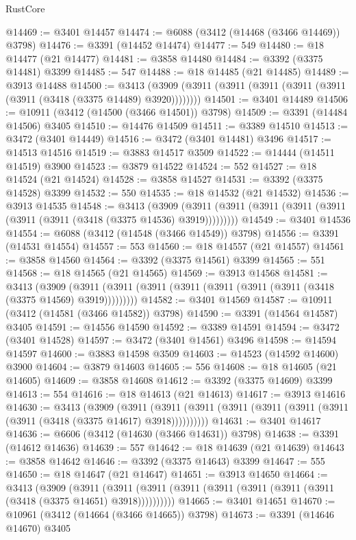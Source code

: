 \begin{lexlean}{RustCore}
\begin{coremodule}
@14469 := @3401 @14457
@14474 := @6088 (@3412 (@14468 (@3466 @14469)) @3798)
@14476 := @3391 (@14452 @14474)
@14477 := 549
@14480 := @18 @14477 (@21 @14477)
@14481 := @3858 @14480
@14484 := @3392 (@3375 @14481) @3399
@14485 := 547
@14488 := @18 @14485 (@21 @14485)
@14489 := @3913 @14488
@14500 := @3413 (@3909 (@3911 (@3911 (@3911 (@3911 (@3911 (@3911 (@3418 (@3375 @14489) @3920))))))))
@14501 := @3401 @14489
@14506 := @10911 (@3412 (@14500 (@3466 @14501)) @3798)
@14509 := @3391 (@14484 @14506) @3405
@14510 := @14476 @14509
@14511 := @3389 @14510
@14513 := @3472 (@3401 @14449)
@14516 := @3472 (@3401 @14481) @3496
@14517 := @14513 @14516
@14519 := @3883 @14517 @3509
@14522 := @14444 (@14511 @14519) @3900
@14523 := @3879 @14522
@14524 := 552
@14527 := @18 @14524 (@21 @14524)
@14528 := @3858 @14527
@14531 := @3392 (@3375 @14528) @3399
@14532 := 550
@14535 := @18 @14532 (@21 @14532)
@14536 := @3913 @14535
@14548 := @3413
    (@3909 (@3911 (@3911 (@3911 (@3911 (@3911 (@3911 (@3911 (@3418 (@3375 @14536) @3919)))))))))
@14549 := @3401 @14536
@14554 := @6088 (@3412 (@14548 (@3466 @14549)) @3798)
@14556 := @3391 (@14531 @14554)
@14557 := 553
@14560 := @18 @14557 (@21 @14557)
@14561 := @3858 @14560
@14564 := @3392 (@3375 @14561) @3399
@14565 := 551
@14568 := @18 @14565 (@21 @14565)
@14569 := @3913 @14568
@14581 := @3413
    (@3909 (@3911 (@3911 (@3911 (@3911 (@3911 (@3911 (@3911 (@3418 (@3375 @14569) @3919)))))))))
@14582 := @3401 @14569
@14587 := @10911 (@3412 (@14581 (@3466 @14582)) @3798)
@14590 := @3391 (@14564 @14587) @3405
@14591 := @14556 @14590
@14592 := @3389 @14591
@14594 := @3472 (@3401 @14528)
@14597 := @3472 (@3401 @14561) @3496
@14598 := @14594 @14597
@14600 := @3883 @14598 @3509
@14603 := @14523 (@14592 @14600) @3900
@14604 := @3879 @14603
@14605 := 556
@14608 := @18 @14605 (@21 @14605)
@14609 := @3858 @14608
@14612 := @3392 (@3375 @14609) @3399
@14613 := 554
@14616 := @18 @14613 (@21 @14613)
@14617 := @3913 @14616
@14630 := @3413
    (@3909
      (@3911 (@3911 (@3911 (@3911 (@3911 (@3911 (@3911 (@3911 (@3418 (@3375 @14617) @3918))))))))))
@14631 := @3401 @14617
@14636 := @6606 (@3412 (@14630 (@3466 @14631)) @3798)
@14638 := @3391 (@14612 @14636)
@14639 := 557
@14642 := @18 @14639 (@21 @14639)
@14643 := @3858 @14642
@14646 := @3392 (@3375 @14643) @3399
@14647 := 555
@14650 := @18 @14647 (@21 @14647)
@14651 := @3913 @14650
@14664 := @3413
    (@3909
      (@3911 (@3911 (@3911 (@3911 (@3911 (@3911 (@3911 (@3911 (@3418 (@3375 @14651) @3918))))))))))
@14665 := @3401 @14651
@14670 := @10961 (@3412 (@14664 (@3466 @14665)) @3798)
@14673 := @3391 (@14646 @14670) @3405

\end{coremodule}
\end{lexlean}
